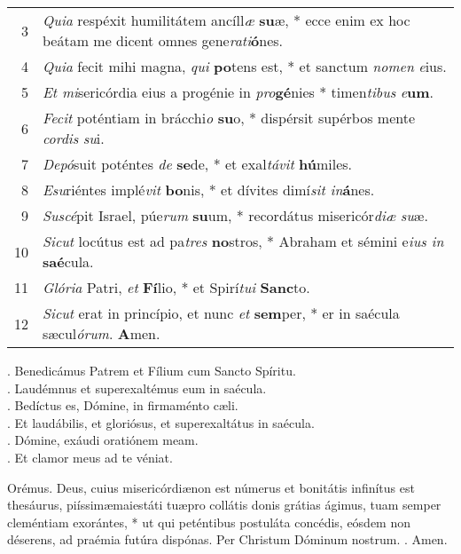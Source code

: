 \documentclass[12pt, a5paper]{book}
\begin{document}
\begin{tabular}{rl}
3 &{\it Quia} respéxit humilitátem ancíll{\it \ae}  {\bf su}\ae, * ecce enim ex hoc beátam me dicent omnes gene{\it rati}{\bf ó}nes.\\
4&{\it Quia} fecit mihi magna, {\it qui} {\bf po}tens est, * et sanctum {\it nomen } {\it e}ius.\\
5&{\it Et mi}sericórdia eius a progénie in {\it pro}{\bf gé}nies * timen{\it tibus }{\it e}{\bf um}.\\
6&{\it Fecit} poténtiam in brácchi{\it o }{\bf su}o, * dispérsit supérbos mente {\it cordis} {\it su}i.\\
7&{\it Depó}suit poténtes {\it de} {\bf se}de, * et exal{\it távit} {\bf hú}miles.\\
8&{\it Esu}riéntes implé{\it vit} {\bf bo}nis, * et dívites dimí{\it sit in}{\bf á}nes.\\
9&{\it Suscé}pit Israel, púe{\it rum} {\bf su}um, * recordátus misericór{\it di\ae } {\it su}\ae.\\
10&{\it Sicut} locútus est ad pa{\it tres} {\bf no}stros, * Abraham et sémini e{\it ius in }{\bf saé}cula.\\
11&{\it Glória} Patri, {\it et} {\bf Fí}lio, * et Spirí{\it tui} {\bf Sanc}to.\\
12&{\it Sicut} erat in princípio, et nunc {\it et} {\bf sem}per, * er in saécula s\ae cul{\it órum}. {\bf A}men.
\end{tabular}



\Vbar . Benedicámus Patrem et Fílium cum Sancto Spíritu.\\
\Rbar . Laudémnus et superexaltémus eum in saécula.\\
\vspace{2mm}
\Vbar . Bedíctus es, Dómine, in firmaménto c\ae li.\\
\Rbar . Et laudábilis, et gloriósus, et superexaltátus in saécula.\\
\vspace{2mm}
\Vbar . Dómine, exáudi oratiónem meam.\\
\Rbar . Et clamor meus ad te véniat.\\
\vspace{5mm}

Orémus.
\vspace{2mm}
Deus, cuius misericórdi\ae non est númerus et bonitátis infinítus est thesáurus, \dag piíssim\ae  maiestáti tu\ae  pro collátis donis grátias ágimus, tuam semper cleméntiam exorántes, * ut qui peténtibus postuláta concédis, eósdem non déserens, ad praémia futúra dispónas. Per Christum Dóminum nostrum. \Rbar . Amen.
\end{document}
